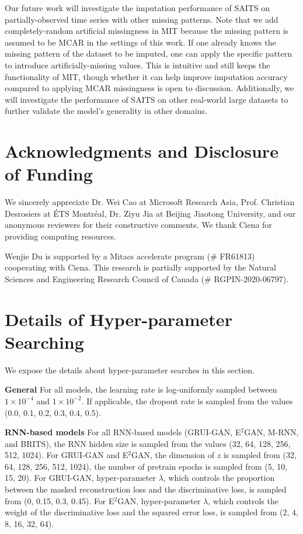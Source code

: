 \documentclass{article}
\begin{document}
Our future work will investigate the imputation performance of SAITS on partially-observed time series with other missing patterns. Note that we add completely-random artificial missingness in MIT because the missing pattern is assumed to be MCAR in the settings of this work. If one already knows the missing pattern of the dataset to be imputed, one can apply the specific pattern to introduce artificially-missing values. This is intuitive and still keeps the functionality of MIT, though whether it can help improve imputation accuracy compared to applying MCAR missingness is open to discussion. Additionally, we will investigate the performance of SAITS on other real-world large datasets to further validate the model's generality in other domains.

\section*{Acknowledgments and Disclosure of Funding}
We sincerely appreciate Dr. Wei Cao at Microsoft Research Asia, Prof. Christian Desrosiers at \'ETS Montr\'eal, Dr. Ziyu Jia at Beijing Jiaotong University, and our anonymous reviewers for their constructive comments.
We thank Ciena for providing computing resources.

Wenjie Du is supported by a Mitacs accelerate program (\# FR61813) cooperating with Ciena.
This research is partially supported by the Natural Sciences and Engineering Research Council of Canada (\# RGPIN-2020-06797).

\clearpage





\clearpage
\appendix
\section{Details of Hyper-parameter Searching}\label{appendix: hyper-parameter search}
We expose the details about hyper-parameter searches in this section.

\textbf{General} \hspace{1em} 
For all models, the learning rate is log-uniformly sampled between $1 \times 10^{-4}$ and $1 \times 10^{-2}$. If applicable, the dropout rate is sampled from the values (0.0, 0.1, 0.2, 0.3, 0.4, 0.5).

\textbf{RNN-based models} \hspace{1em} 
For all RNN-based models (GRUI-GAN, E$^2$GAN, M-RNN, and BRITS), the RNN hidden size is sampled from the values (32, 64, 128, 256, 512, 1024). For GRUI-GAN and E$^2$GAN, the dimension of $z$ is sampled from (32, 64, 128, 256, 512, 1024), the number of pretrain epochs is sampled from (5, 10, 15, 20). For GRUI-GAN, hyper-parameter $\lambda$, which controls the proportion between the masked reconstruction loss and the discriminative loss, is sampled from (0, 0.15, 0.3, 0.45). For E$^2$GAN, hyper-parameter $\lambda$, which controls the weight of the discriminative loss and the squared error loss, is sampled from (2, 4, 8, 16, 32, 64).
\end{document}
